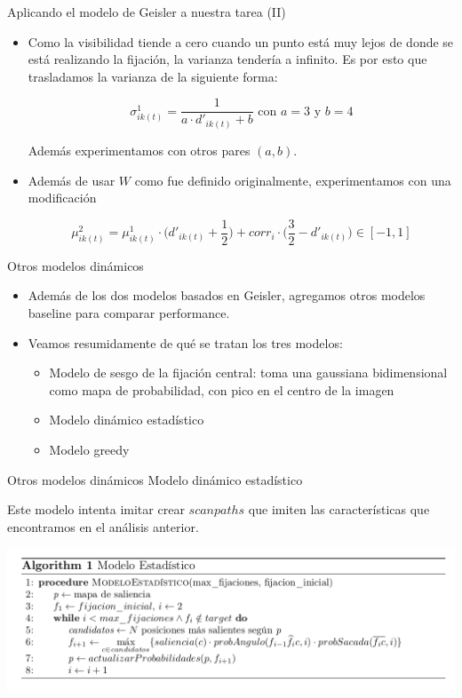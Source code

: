 \documentclass[compress]{beamer}
\begin{document}
\begin{frame}{Aplicando el modelo de Geisler a nuestra tarea (II)}
\begin{itemize}
\item Como la visibilidad tiende a cero cuando un punto está muy lejos de donde se está realizando la fijación, la varianza tendería a infinito. Es por esto que trasladamos la varianza de la siguiente forma:

$$ \sigma_{ik(t)}^1 = \displaystyle\frac{1}{a \cdot d'_{ik(t)} + b} \text{ con } a = 3 \text{ y } b = 4$$ 

Además experimentamos con otros pares $(a,b)$.
\item Además de usar $W$ como fue definido originalmente, experimentamos con una modificación 

$$\mu_{ik(t)}^2 = \mu^1_{ik(t)} \cdot \Big(d'_{ik(t)} + \dfrac{1}{2}\Big) + corr_{i} \cdot \Big(\dfrac{3}{2} - d'_{ik(t)}\Big) \in [-1, 1]$$

\end{itemize}
\end{frame}

\begin{frame}{Otros modelos dinámicos}
\begin{itemize}
\item Además de los dos modelos basados en Geisler, agregamos otros modelos baseline para comparar performance.
\item Veamos resumidamente de qué se tratan los tres modelos:
\begin{itemize}
\item Modelo de sesgo de la fijación central: toma una gaussiana bidimensional como mapa de probabilidad, con pico en el centro de la imagen
\item Modelo dinámico estadístico
\item Modelo greedy
\end{itemize}
\end{itemize}
\end{frame}

\begin{frame}[fragile]{Otros modelos dinámicos}
{Modelo dinámico estadístico}

Este modelo intenta imitar crear $scanpaths$ que imiten las características que encontramos en el análisis anterior.

\begin{center}
\includegraphics[width=\textwidth]{images/modelo-estadistico.png}
\end{center}

\end{frame}
\end{document}
